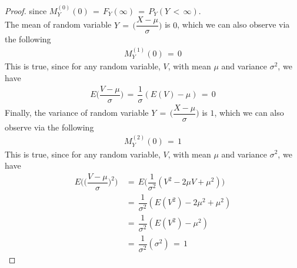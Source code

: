 \begin{theorem}
\begin{proof}
        since $M_{Y}^{(0)} (0) \hspace{2pt} = \hspace{2pt} F_{Y} (\infty) \hspace{2pt} = \hspace{2pt} P_{Y} (Y \hspace{2pt} < \hspace{2pt} \infty)$. \\[1ex]
        The mean of random variable $Y \hspace{2pt} = \hspace{2pt} \Big(\dfrac{X - \mu}{\sigma}\Big)$ is $0$, which we can also observe via the following
        \begin{align*}
            M_{Y}^{(1)} (0) \hspace{2pt} = \hspace{2pt} 0
        \end{align*}
        This is true, since for any random variable, $V$, with mean $\mu$ and variance $\sigma^{2}$, we have
        \begin{align*}
            E\Big(\dfrac{V - \mu}{\sigma}\Big) \hspace{2pt} = \hspace{2pt} \dfrac{1}{\sigma} (E(V) - \mu) \hspace{2pt} = \hspace{2pt} 0 
        \end{align*}
        Finally, the variance of random variable $Y \hspace{2pt} = \hspace{2pt} \Big(\dfrac{X - \mu}{\sigma}\Big)$ is $1$, which we can also observe via the following
        \begin{align*}
            M_{Y}^{(2)} (0) \hspace{2pt} = \hspace{2pt} 1
        \end{align*}
        This is true, since for any random variable, $V$, with mean $\mu$ and variance $\sigma^{2}$, we have
        \begin{align*}
            E\Big(\Big(\dfrac{V - \mu}{\sigma}\Big)^{2}\Big) \hspace{2pt} &= \hspace{2pt} E\Big(\dfrac{1}{\sigma^{2}}(V^{2} - 2\mu V + \mu^{2})\Big) \\[1ex]
            &= \hspace{2pt} \dfrac{1}{\sigma^{2}} (E(V^{2}) - 2\mu^{2} + \mu^{2}) \\[1ex]
            &= \hspace{2pt} \dfrac{1}{\sigma^{2}} (E(V^{2}) - \mu^{2}) \\[1ex]
            &= \hspace{2pt} \dfrac{1}{\sigma^{2}} (\sigma^{2}) \hspace{2pt} = \hspace{2pt} 1
        \end{align*}
    \end{proof}
\end{theorem}